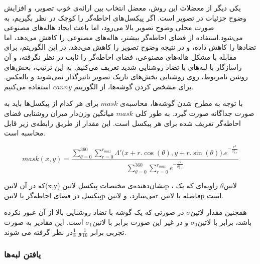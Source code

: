 یکی دیگر از معضلات این روش، معضل انتخاب بین ارائه‌ی خوب تصویر، و افزایش وضوح جزئیات در تصویر است. اگر پیکسل‌های احاطه‌گر را کوچک در نظر بگیریم، به صورت محلی وضوح تصویر بالا می‌رود، اما باعث ایجاد هاله‌های مصنوعی می‌شود.استفاده از فضای احاطه‌گر بیشتر، هاله‌های مصنوعی را کاهش می‌دهد، اما تضادها را کاهش داده، و در نتیجه وضوح تصویر را کاهش می‌دهد.
در این الگوریتم، برای مقابله با مشکل هاله‌های مصنوعی، فضای احاطه‌گر را ثابت در نظر نگرفته، و آن راسازگار با لبه‌های با تضاد روشنایی شدید تعریف می‌کنیم. به این ترتیب، بخش‌های روشن نامربوط، روی روشنایی بخش‌های تاریک تصویر تاثیرگذار نمی‌شوند و بالعکس. 
برای مشخص کردن گوشه‌ها، از الگوریتم $canny$ استفاده می‌کنیم.

با توجه به مطرح شدن گوشه‌ها،  محاسبه‌ی $mask$ برای هر کدام از پیکسل‌ها باید به صورت جداگانه صورت گیرد. به طور کلی $mask$ میانگین وزن‌دار میزان روشنایی فضای احاطه‌گر تعریف شده برای هر پیکسل است. این مقدار از طریق رابطه‌ی زیر قابل محاسبه است. 

\begin{equation}
	mask(x,y) = \frac
	{\sum_{\theta=0}^{360}\sum_{r=0}^{r_{max}}
		\Lambda'\big(x+r.\cos(\theta), y+r.\sin(\theta) \big).e^{-\frac{r^2}{\sigma_{\theta,r}^2}}}
	{\sum_{\theta=0}^{360}\sum_{r=0}^{r_{max}}e^{-\frac{r^2}{\sigma_{\theta,r}^2}}}
\end{equation}

 
 که در آن 
 ‌لاتین{(x,y) }
 نشان‌دهنده‌ی مختصات پیکسل
  ‌لاتین{p } ، 
  ‌لاتین{$ \theta $ }
 زاویه‌ای که یک پیکسل در فضای احاطه‌گر با 
  ‌لاتین{p } 
 می‌سازد، و 
  ‌لاتین{r }
 فاصله  با
  ‌لاتین{p } 
   است.
 
 همچنین مقدار  
   ‌لاتین{$\sigma$}
  در صورتی که  یک گوشه با تضاد روشنایی بالا از آن عبور نکرده باشد، برابر با 
   ‌لاتین{$\sigma_{0}$}
   و در غیر این صورت برابر با 
   ‌لاتین{$\sigma_{1}$}
   است.
این مقادیر به صورت تجربی برابر $\frac{1}{16} $و $\frac{1}{8} $در نظر گرفته می شوند.
 
 \subsubsection{یافتن لبه‌ها }
 
